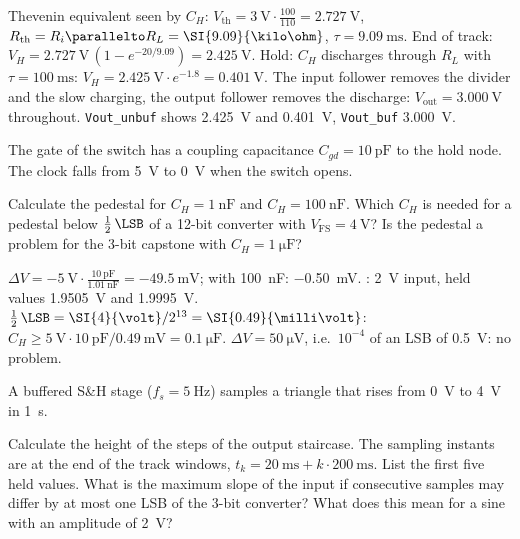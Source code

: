 \begin{solution}
\begin{talist}
\ta Thevenin equivalent seen by $C_H$: $V_\mathrm{th} = \SI{3}{\volt}\cdot\frac{100}{110} = \SI{2.727}{\volt}$,
	$R_\mathrm{th} = R_i\parallelto R_L = \SI{9.09}{\kilo\ohm}$, $\tau = \SI{9.09}{\milli\second}$.
\ta End of track: $V_H = \SI{2.727}{\volt}\,(1-e^{-20/9.09}) = \SI{2.425}{\volt}$.
	Hold: $C_H$ discharges through $R_L$ with $\tau = \SI{100}{\milli\second}$:
	$V_H = \SI{2.425}{\volt}\cdot e^{-1.8} = \SI{0.401}{\volt}$.
\ta The input follower removes the divider and the slow charging, the output follower
	removes the discharge: $V_\mathrm{out} = \SI{3.000}{\volt}$ throughout.
	\newline{}\newline \texttt{Vout\_unbuf} shows \SI{2.425}{\volt} and
	\SI{0.401}{\volt}, \texttt{Vout\_buf} \SI{3.000}{\volt}.
\end{talist}
\end{solution}

The gate of the switch has a coupling capacitance $C_{gd} = \SI{10}{\pico\farad}$
to the hold node. The clock falls from \SI{5}{\volt} to \SI{0}{\volt} when the switch opens.
\begin{talist}
\ta Calculate the pedestal for $C_H = \SI{1}{\nano\farad}$ and $C_H = \SI{100}{\nano\farad}$.
\ta Which $C_H$ is needed for a pedestal below $\frac12\,\LSB$ of a 12-bit
	converter with $V_\mathrm{FS} = \SI{4}{\volt}$?
\ta Is the pedestal a problem for the 3-bit capstone with $C_H = \SI{1}{\micro\farad}$?
\end{talist}

\begin{solution}
\begin{talist}
\ta $\Delta V = -\SI{5}{\volt}\cdot\frac{\SI{10}{\pico\farad}}{\SI{1.01}{\nano\farad}} = \SI{-49.5}{\milli\volt}$;
	with \SI{100}{\nano\farad}: \SI{-0.50}{\milli\volt}.
	\newline{}: \SI{2}{\volt} input, held values \SI{1.9505}{\volt} and \SI{1.9995}{\volt}.
\ta $\frac12\,\LSB = \SI{4}{\volt}/2^{13} = \SI{0.49}{\milli\volt}$:
	$C_H \geq \SI{5}{\volt}\cdot\SI{10}{\pico\farad}/\SI{0.49}{\milli\volt} = \SI{0.1}{\micro\farad}$.
\ta $\Delta V = \SI{50}{\micro\volt}$, i.e.\ $10^{-4}$ of an LSB of \SI{0.5}{\volt}: no problem.
\end{talist}
\end{solution}

A buffered S\&H stage ($f_s = \SI{5}{\hertz}$) samples a triangle that rises from
\SI{0}{\volt} to \SI{4}{\volt} in \SI{1}{\second}.
\begin{talist}
\ta Calculate the height of the steps of the output staircase.
\ta The sampling instants are at the end of the track windows,
	$t_k = \SI{20}{\milli\second} + k\cdot\SI{200}{\milli\second}$. List the first five held values.
\ta What is the maximum slope of the input if consecutive samples may differ by
	at most one LSB of the 3-bit converter? What does this mean for a sine with an
	amplitude of \SI{2}{\volt}?
\end{talist}

